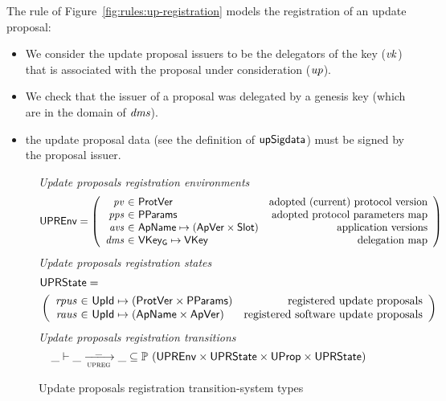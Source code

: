\clearpage

The rule of Figure~\ref{fig:rules:up-registration} models the registration of
an update proposal:
\begin{itemize}
\item We consider the update proposal issuers to be the delegators of the key
  ($\mathit{vk}$) that is associated with the proposal under consideration
  ($\mathit{up}$).
\item We check that the issuer of a proposal was delegated by a genesis key
  (which are in the domain of $\mathit{dms}$).
\item the update proposal data (see the definition of $\mathsf{upSigdata}$) must
  be signed by the proposal issuer.
\end{itemize}

\begin{figure}[htb]
  \emph{Update proposals registration  environments}
    \begin{equation*}
    \UPREnv =
    \left(
      \begin{array}{r@{~\in~}lr}
        \var{pv} & \ProtVer & \text{adopted (current) protocol version}\\
        \var{pps} & \PPMMap & \text{adopted protocol parameters map}\\
        \var{avs} & \ApName \mapsto (\ApVer \times \Slot)
        & \text{application versions}\\
        \var{dms} & \VKeyGen \mapsto \VKey & \text{delegation map}\\
      \end{array}
    \right)
  \end{equation*}
  \emph{Update proposals registration states}
  \begin{align*}
    & \UPRState = \\
    & \left(
      \begin{array}{r@{~\in~}lr}
        \var{rpus} & \UPropId \mapsto (\ProtVer \times \PPMMap)
        & \text{registered update proposals}\\
        \var{raus} & \UPropId \mapsto (\ApName \times \ApVer)
        & \text{registered software update proposals}
      \end{array}
    \right)
  \end{align*}
  \emph{Update proposals registration transitions}
  \begin{equation*}
    \var{\_} \vdash
    \var{\_} \trans{upreg}{\_} \var{\_}
    \subseteq \powerset (\UPREnv \times \UPRState \times \UProp \times \UPRState)
  \end{equation*}
  \caption{Update proposals registration transition-system types}
  \label{fig:ts-types:up-registration}
\end{figure}

